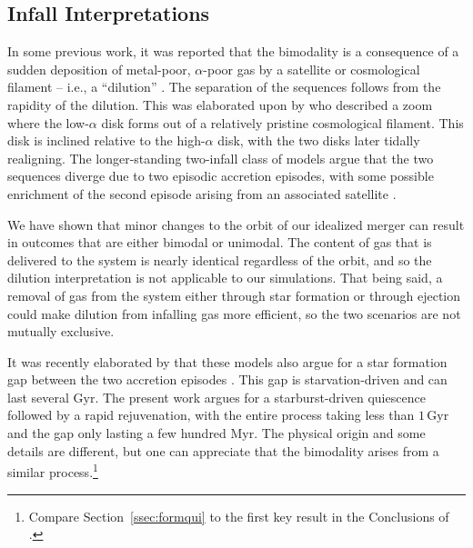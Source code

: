\documentclass[twocolumn,linenumbers,trackchanges]{aastex631}
\newcommand{\Gyr}{\ensuremath{\textrm{Gyr}}}
\newcommand{\Myr}{\ensuremath{\textrm{Myr}}}
\begin{document}
\subsection{Infall Interpretations}\label{ssec:dilute}
In some previous work, it was reported that the bimodality is a consequence of a sudden deposition of metal-poor, $\alpha$-poor gas by a satellite or cosmological filament -- i.e., a ``dilution'' \citep{2020MNRAS.491.5435B,2021MNRAS.503.5846R}. The separation of the sequences follows from the rapidity of the dilution. This was elaborated upon by \citet{2021MNRAS.503.5868R} who described a zoom where the low-$\alpha$ disk forms out of a relatively pristine cosmological filament. This disk is inclined relative to the high-$\alpha$ disk, with the two disks later tidally realigning. The longer-standing two-infall class of models argue that the two sequences diverge due to two episodic accretion episodes, with some possible enrichment of the second episode arising from an associated satellite \citep{1997ApJ...477..765C,2009IAUS..254..191C,2017MNRAS.472.3637G,2019A&A...623A..60S}.

We have shown that minor changes to the orbit of our idealized merger can result in outcomes that are either bimodal or unimodal. The content of gas that is delivered to the system is nearly identical regardless of the orbit, and so the dilution interpretation is not applicable to our simulations. That being said, a removal of gas from the system either through star formation or through ejection could make dilution from infalling gas more efficient, so the two scenarios are not mutually exclusive.

It was recently elaborated by \citet{2024arXiv240511025S} that these models also argue for a star formation gap between the two accretion episodes \citep[see also][]{1996ASPC...92..307G,1998A&A...338..161F,2000A&A...358..671G,2015A&A...578A..87S,2020A&A...640A..81N}. This gap is starvation-driven and can last several \Gyr{}. The present work argues for a starburst-driven quiescence followed by a rapid rejuvenation, with the entire process taking less than $1\,\Gyr$ and the gap only lasting a few hundred \Myr{}. The physical origin and some details are different, but one can appreciate that the bimodality arises from a similar process.\footnote{Compare Section~\ref{ssec:formqui} to the first key result in the Conclusions of \citet{2024arXiv240511025S}.}
\end{document}
